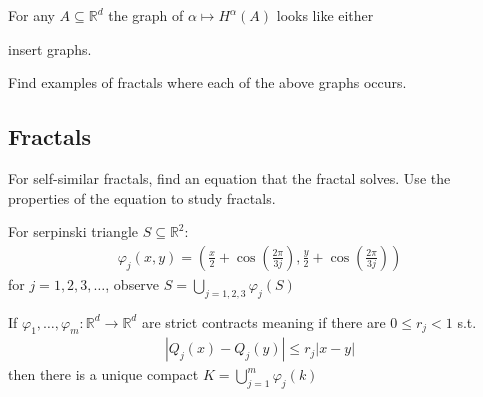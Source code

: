 For any $A \subseteq \mathbb{R}^d$ the graph of $\alpha \mapsto H^{\alpha} (A)$ looks like either 

insert graphs.

\begin{exercise}
	Find examples of fractals where each of the above graphs occurs.
\end{exercise}

\subsection{Fractals}

For self-similar fractals, find an equation that the fractal solves. Use the properties of the equation to study fractals.

\begin{example}
	For serpinski triangle $S \subseteq \mathbb{R}^2$:
	\begin{align*}
		\varphi_{j} (x, y) = (\frac{x}{2} + \cos(\frac{2 \pi}{3 j}), \frac{y}{2} + \cos(\frac{2 \pi}{3 j}) )
	\end{align*} for $j = 1,2,3, \ldots$, observe
	$S = \bigcup_{j = 1,2,3} \varphi_j (S) $
\end{example}

\begin{theorem}
	If $\varphi_{1}, \ldots, \varphi_{m} : \mathbb{R}^d \to \mathbb{R}^d$ are strict contracts meaning if there are $0 \leq r_{j} < 1$ s.t.
	\begin{align*}
		| Q_j (x) - Q_j (y) | \leq r_{j} |x - y |
	\end{align*} then there is a unique compact
	$K = \bigcup_{j=1}^{m} \varphi_{j} (k)$
\end{theorem}

